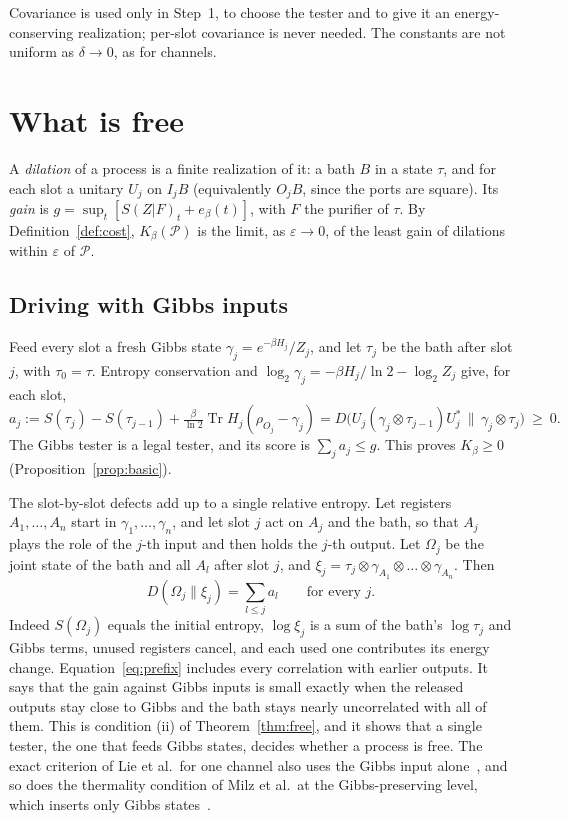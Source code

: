 \documentclass[11pt]{article}
\theoremstyle{definition}
\theoremstyle{remark}
\newcommand{\Tr}{\operatorname{Tr}}
\newcommand{\Kb}{K_\beta}
\newcommand{\Pp}{\mathcal P}
\begin{document}
Covariance is used only in Step~1, to choose the tester and to give it an energy-conserving realization; per-slot covariance is never needed. The constants are not uniform as $\delta\to0$, as for channels.

\section{What is free}\label{sec:free}

A \emph{dilation} of a process is a finite realization of it: a bath $B$ in a state $\tau$, and for each slot a unitary $U_j$ on $I_jB$ (equivalently $O_jB$, since the ports are square). Its \emph{gain} is $g=\sup_t[S(Z|F)_t+e_\beta(t)]$, with $F$ the purifier of $\tau$. By Definition~\ref{def:cost}, $\Kb(\Pp)$ is the limit, as $\varepsilon\to0$, of the least gain of dilations within $\varepsilon$ of $\Pp$.

\subsection{Driving with Gibbs inputs}

Feed every slot a fresh Gibbs state $\gamma_j=e^{-\beta H_j}/Z_j$, and let $\tau_j$ be the bath after slot $j$, with $\tau_0=\tau$. Entropy conservation and $\log_2\gamma_j=-\beta H_j/\ln2-\log_2Z_j$ give, for each slot,
\begin{equation}\label{eq:defect}
a_j:=S(\tau_j)-S(\tau_{j-1})+\tfrac{\beta}{\ln2}\Tr H_j(\rho_{O_j}-\gamma_j)=D\bigl(U_j(\gamma_j\otimes\tau_{j-1})U_j^*\,\big\|\,\gamma_j\otimes\tau_j\bigr)\ \ge\ 0.
\end{equation}
The Gibbs tester is a legal tester, and its score is $\sum_ja_j\le g$. This proves $\Kb\ge0$ (Proposition~\ref{prop:basic}).

The slot-by-slot defects add up to a single relative entropy. Let registers $A_1,\dots,A_n$ start in $\gamma_1,\dots,\gamma_n$, and let slot $j$ act on $A_j$ and the bath, so that $A_j$ plays the role of the $j$-th input and then holds the $j$-th output. Let $\Omega_j$ be the joint state of the bath and all $A_l$ after slot $j$, and $\xi_j=\tau_j\otimes\gamma_{A_1}\otimes\dots\otimes\gamma_{A_n}$. Then
\begin{equation}\label{eq:prefix}
D(\Omega_j\|\xi_j)=\sum_{l\le j}a_l\qquad\text{for every }j.
\end{equation}
Indeed $S(\Omega_j)$ equals the initial entropy, $\log\xi_j$ is a sum of the bath's $\log\tau_j$ and Gibbs terms, unused registers cancel, and each used one contributes its energy change. Equation~\eqref{eq:prefix} includes every correlation with earlier outputs. It says that the gain against Gibbs inputs is small exactly when the released outputs stay close to Gibbs and the bath stays nearly uncorrelated with all of them. This is condition (ii) of Theorem~\ref{thm:free}, and it shows that a single tester, the one that feeds Gibbs states, decides whether a process is free. The exact criterion of Lie et al.\ for one channel also uses the Gibbs input alone~\cite{LieEtAl26}, and so does the thermality condition of Milz et al.\ at the Gibbs-preserving level, which inserts only Gibbs states~\cite[Def.~8]{Milz26}.
\end{document}
